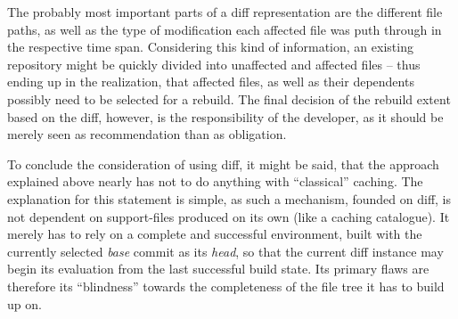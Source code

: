 The probably most important parts of a diff representation are the different file paths, as well as the type of modification each affected file was puth through in the respective time span. Considering this kind of information, an existing repository might be quickly divided into unaffected and affected files -- thus ending up in the realization, that affected files, as well as their dependents possibly need to be selected for a rebuild. The final decision of the rebuild extent based on the diff, however, is the responsibility of the developer, as it should be merely seen as recommendation than as obligation.

To conclude the consideration of using diff, it might be said, that the approach explained above nearly has not to do anything with ``classical'' caching. The explanation for this statement is simple, as such a mechanism, founded on diff, is not dependent on support-files produced on its own (like a caching catalogue). It merely has to rely on a complete and  successful environment, built with the currently selected \emph{base} commit as its \emph{head}, so that the current diff instance may begin its evaluation from the last successful build state. Its primary flaws are therefore its ``blindness'' towards the completeness of the file tree it has to build up on.
